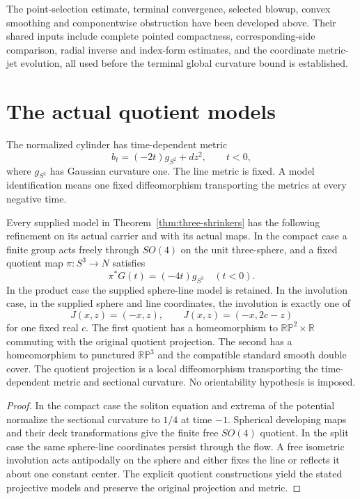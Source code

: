 \label{rem:ancient-compactness-gaps}
The point-selection estimate, terminal convergence, selected blowup,
convex smoothing and componentwise obstruction have been developed
above.  Their shared inputs include complete pointed compactness,
corresponding-side comparison, radial inverse and index-form estimates,
and the coordinate metric-jet evolution, all used before the
terminal global curvature bound is established.


\section{The actual quotient models}

The normalized cylinder has time-dependent metric
\[
                  b_t=(-2t)g_{S^2}+dz^2,\qquad t<0,
\]
where $g_{S^2}$ has Gaussian curvature one.  The line metric is fixed.
A model identification means one fixed diffeomorphism transporting
the metrics at every negative time.

\begin{theorem}
\label{thm:ancient-model-identifications}
Every supplied model in Theorem~\ref{thm:three-shrinkers} has the
following refinement on its actual carrier and with its actual maps.
In the compact case a finite group acts freely through $SO(4)$ on
the unit three-sphere, and a fixed quotient map $\pi:S^3\to N$ satisfies
\[
                      \pi^*G(t)=(-4t)g_{S^3}\quad(t<0).
\]
In the product case the supplied sphere-line model is retained.
In the involution case, in the supplied sphere and line coordinates,
the involution is exactly one of
\[
                 J(x,z)=(-x,z),\qquad J(x,z)=(-x,2c-z)
\]
for one fixed real $c$.
The first quotient has a homeomorphism to
$\mathbb{RP}^2\times\mathbb R$ commuting with the original quotient
projection.  The second has a homeomorphism to punctured
$\mathbb{RP}^3$ and the compatible standard smooth double cover.
The quotient projection is a local diffeomorphism transporting
the time-dependent metric and sectional curvature.
No orientability hypothesis is imposed.
\end{theorem}
\begin{proof}
In the compact case the soliton equation and extrema of the potential
normalize the sectional curvature to $1/4$ at time $-1$. Spherical developing
maps and their deck transformations give the finite free $SO(4)$ quotient. In
the split case the same sphere-line coordinates persist through the flow. A
free isometric involution acts antipodally on the sphere and either fixes the
line or reflects it about one constant center. The explicit quotient
constructions yield the stated projective models and preserve the original
projection and metric.
\end{proof}

